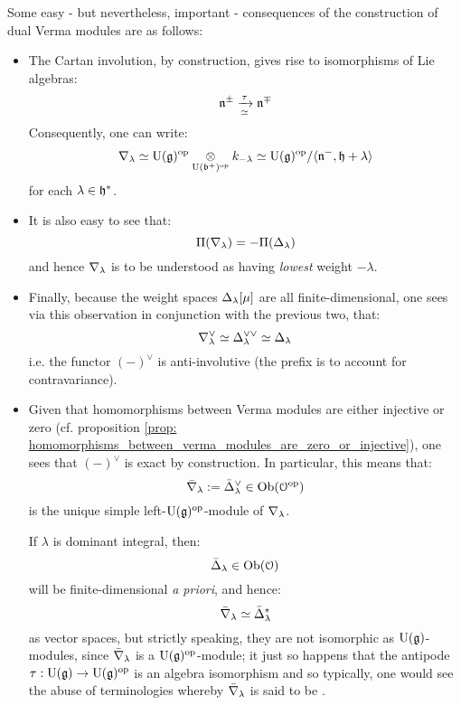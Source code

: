         \begin{remark} \label{remark: weights_of_dual_verma_modules}
            Some easy - but nevertheless, important - consequences of the construction of dual Verma modules are as follows:
            \begin{itemize}
                \item The Cartan involution, by construction, gives rise to isomorphisms of Lie algebras:
                    $$\mathfrak{n}^{\pm} \xrightarrow[\simeq]{\tau} \mathfrak{n}^{\mp}$$
                Consequently, one can write:
                    $$\costandard_{\lambda} \cong \rmU(\g)^{\op} \tensor_{\rmU(\b^+)^{\op}} k_{-\lambda} \cong \rmU(\g)^{\op}/\<\n^-, \h + \lambda\>$$
                for each $\lambda \in \mathfrak{h}^*$. 
                \item It is also easy to see that:
                    $$\Pi(\nabla_{\lambda}) = -\Pi(\Delta_{\lambda})$$
                and hence $\nabla_{\lambda}$ is to be understood as having \textit{lowest} weight $-\lambda$. 
                \item Finally, because the weight spaces $\Delta_{\lambda}[\mu]$ are all finite-dimensional, one sees via this observation in conjunction with the previous two, that:
                    $$\nabla_{\lambda}^{\vee} \simeq \Delta_{\lambda}^{\vee \vee} \simeq \Delta_{\lambda}$$
                i.e. the functor $(-)^{\vee}$ is anti-involutive (the prefix  is to account for contravariance). 
                \item Given that homomorphisms between Verma modules are either injective or zero (cf. proposition \ref{prop: homomorphisms_between_verma_modules_are_zero_or_injective}), one sees that $(-)^{\vee}$ is exact by construction. In particular, this means that: 
                    $$\bar{\nabla}_{\lambda} := \bar{\Delta}_{\lambda}^{\vee} \in \mathrm{Ob}(\mathcal{O}^{\mathrm{op}})$$
                is the unique simple left-$\mathrm{U}(\mathfrak{g})^{\mathrm{op}}$-module of $\nabla_{\lambda}$. 
                
                If $\lambda$ is dominant integral, then:
                    $$\bar{\Delta}_{\lambda} \in \mathrm{Ob}(\mathcal{O})$$
                will be finite-dimensional \textit{a priori}, and hence:
                    $$\bar{\nabla}_{\lambda} \simeq \bar{\Delta}_{\lambda}^*$$
                as vector spaces, but strictly speaking, they are not isomorphic as $\mathrm{U}(\mathfrak{g})$-modules, since $\bar{\nabla}_{\lambda}$ is a $\mathrm{U}(\mathfrak{g})^{\mathrm{op}}$-module; it just so happens that the antipode $\tau: \mathrm{U}(\mathfrak{g}) \to \mathrm{U}(\mathfrak{g})^{\mathrm{op}}$ is an algebra isomorphism and so typically, one would see the abuse of terminologies whereby $\bar{\nabla}_{\lambda}$ is said to be .  
            \end{itemize}
        \end{remark}
